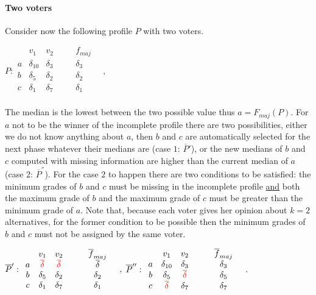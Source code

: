 \documentclass[version=3.21, pagesize, twoside=off, bibliography=totoc, DIV=calc, fontsize=12pt, a4paper]{scrartcl}
\begin{document}
\paragraph{Two voters}
Consider now the following profile $P$ with two voters.
\begin{center}
	$P:
	\begin{array}{ccccc}
		& v_1 & v_2 & \quad & f_{maj} \\
		a &	\delta_{10} & \delta_3 & \quad& \delta_3 \\
		b &	\delta_5 & \delta_2 &\quad& \delta_2 \\
		c &	\delta_1 & \delta_7 &\quad& \delta_1 \\
	\end{array} \quad, \qquad
	$
\end{center}
The median is the lowest between the two possible value thus $a=F_{maj}(P)$. For $a$ not to be the winner of the incomplete profile there are two possibilities, either we do not know anything about $a$, then $b$ and $c$ are automatically selected for the next phase whatever their medians are 
(case $1$: $\overline{P}'$), or the new medians of $b$ and $c$  computed with missing information are higher than the current median of $a$ (case $2$: $\overline{P}^{\second}$). For the case $2$ to happen there are two conditions to be satisfied: the minimum grades of $b$ and $c$ must be missing in the incomplete profile \underline{and} both the maximum grade of $b$ and the maximum grade of $c$ must be greater than the minimum grade of $a$. Note that, because each voter gives her opinion about $k=2$ alternatives, for the former condition to be possible then the minimum grades of $b$ and $c$ must not be assigned by the same voter. 

\begin{center}
	$\overline{P}':
	\begin{array}{ccccc}
		& v_1 & v_2 & \quad & \overline{f}_{maj} \\
		a &	{\color{red}\overline{\delta}} & {\color{red}\overline{\delta}} & \quad& \overline{\delta} \\
		b &	\delta_5 & \delta_2 &\quad& \delta_2 \\
		c &	\delta_1 & \delta_7 &\quad& \delta_1 \\
	\end{array} \quad,
	$
	$\overline{P}^{\prime\prime}:
	\begin{array}{ccccc}
		& v_1 & v_2 & \quad & \overline{f}_{maj} \\
		a &	\delta_{10} & \delta_3 & \quad& \delta_3 \\
		b &	\delta_5 & {\color{red}\overline{\delta}} &\quad& \delta_5 \\
		c &	{\color{red}\overline{\delta}} & \delta_7 &\quad& \delta_7 \\
	\end{array} \quad.
	$
\end{center}
\end{document}
